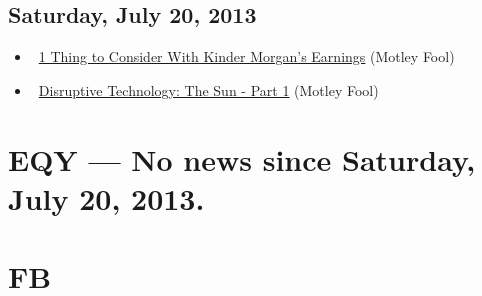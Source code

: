 \documentclass[11pt,asymmetric]{article}
\begin{document}
\subsection*{Saturday, July 20, 2013}
\begin{itemize}
\item\ \href{http://www.fool.com/investing/general/2013/07/20/1-thing-to-consider-with-kinder-morgans-earnings.aspx?source=eogyholnk0000001}{1 Thing to Consider With Kinder Morgan's Earnings} (Motley Fool)
\item\ \href{http://beta.fool.com/wpatoka/2013/07/19/disruptive-technology-the-sun-part-1/40674/?source=eogyholnk0000001}{Disruptive Technology: The Sun - Part 1} (Motley Fool)
\end{itemize}

\section*{EQY --- No news since Saturday, July 20, 2013.}


\section*{FB}
\end{document}
